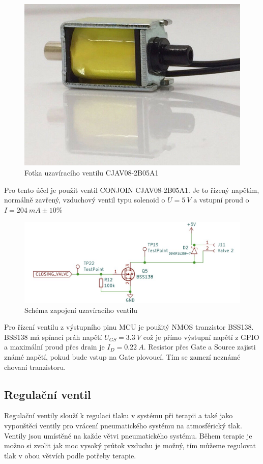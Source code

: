 \begin{figure}[H]
    \includegraphics[width=0.9\linewidth]{pictures/closing_valve.jpg}
    \caption{Fotka uzavíracího ventilu CJAV08-2B05A1}
    \label{fig:closing_valve}
\end{figure}

Pro tento účel je použit ventil CONJOIN CJAV08-2B05A1. Je to řízený napětím, normálně zavřený, vzduchový ventil typu solenoid  o $U = 5 \ V$ a vstupní proud o $I = 204 \ mA \pm 10\% $

\begin{figure}[H]
    \includegraphics[width=0.9\linewidth]{pictures/closing_valve_driver.jpg}
    \caption{Schéma zapojení uzavíracího ventilu}
    \label{fig:closing_valve_driver}
\end{figure}

Pro řízení ventilu z výstupního pinu MCU je použitý NMOS tranzistor BSS138. BSS138 má spínací práh napětí $U_{GS} = 3.3 \ V$ což je přímo výstupní napětí z GPIO a maximální proud přes drain je $I_D = 0.22 \ A$. Resistor přes Gate a Source zajisti známé napětí, pokud bude vstup na Gate plovoucí. Tím se zamezí neznámé chovaní tranzistoru.

\subsection{Regulační ventil}
Regulační ventily slouží k regulaci tlaku v systému při terapii a také jako vypouštěcí ventily pro vrácení pneumatického systému na atmosférický tlak. Ventily jsou umístěné na každe větvi pneumatického systému. Během terapie je možno si zvolit jak moc vysoký průtok vzduchu je možný, tím můžeme regulovat tlak v obou větvích podle potřeby terapie. \par

